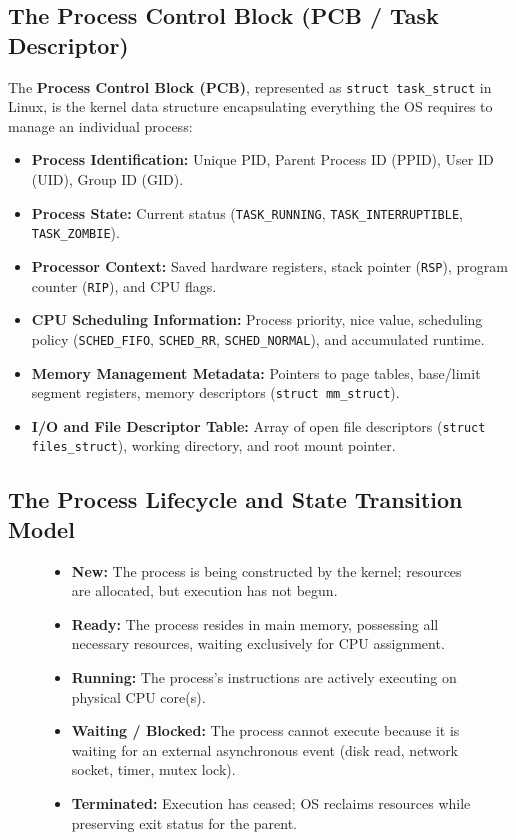 \subsection{The Process Control Block (PCB / Task Descriptor)}
The \textbf{Process Control Block (PCB)}, represented as \texttt{struct task\_struct} in Linux, is the kernel data structure encapsulating everything the OS requires to manage an individual process:
\begin{itemize}
    \item \textbf{Process Identification:} Unique PID, Parent Process ID (PPID), User ID (UID), Group ID (GID).
    \item \textbf{Process State:} Current status (\texttt{TASK\_RUNNING}, \texttt{TASK\_INTERRUPTIBLE}, \texttt{TASK\_ZOMBIE}).
    \item \textbf{Processor Context:} Saved hardware registers, stack pointer (\texttt{RSP}), program counter (\texttt{RIP}), and CPU flags.
    \item \textbf{CPU Scheduling Information:} Process priority, nice value, scheduling policy (\texttt{SCHED\_FIFO}, \texttt{SCHED\_RR}, \texttt{SCHED\_NORMAL}), and accumulated runtime.
    \item \textbf{Memory Management Metadata:} Pointers to page tables, base/limit segment registers, memory descriptors (\texttt{struct mm\_struct}).
    \item \textbf{I/O and File Descriptor Table:} Array of open file descriptors (\texttt{struct files\_struct}), working directory, and root mount pointer.
\end{itemize}

\subsection{The Process Lifecycle and State Transition Model}
\begin{figure}[htbp]
\centering
\begin{tcolorbox}[colback=codebg, colframe=primary, title=\textbf{Five-State Process Transition State Machine}]
\begin{itemize}
    \item \textbf{New:} The process is being constructed by the kernel; resources are allocated, but execution has not begun.
    \item \textbf{Ready:} The process resides in main memory, possessing all necessary resources, waiting exclusively for CPU assignment.
    \item \textbf{Running:} The process's instructions are actively executing on physical CPU core(s).
    \item \textbf{Waiting / Blocked:} The process cannot execute because it is waiting for an external asynchronous event (disk read, network socket, timer, mutex lock).
    \item \textbf{Terminated:} Execution has ceased; OS reclaims resources while preserving exit status for the parent.
\end{itemize}
\end{tcolorbox}
\end{figure}

